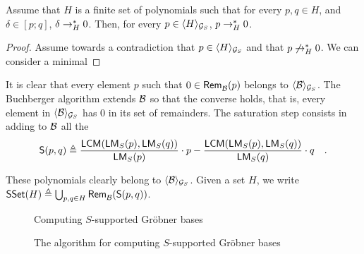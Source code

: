 \begin{lemma}
  \label{lem:weak-complete-impl-strong}
  Assume that $H$ is a finite set of polynomials
  such that for every $p, q \in H$, and $\delta \in [p;q]$,
  $\delta \to^*_{H} 0$.
  Then, for every $p \in \langle H\rangle_{\mathcal{G}_S}$,
  $p \to^*_{H} 0$.
\end{lemma}
\begin{proof}
  Assume towards a contradiction that $p \in \langle H\rangle_{\mathcal{G}_S}$
  and that $p \not\to^*_{H} 0$.
  We can consider a minimal
\end{proof}

\AP It is clear that every element $p$ such that $0 \in \rem{\Basis}{p}$
belongs to $\gen{\Basis}{\group_S}$. The Buchberger algorithm extends $\Basis$
so that the converse holds, that is, every element in $\gen{\Basis}{\group_S}$
has $0$ in its set of remainders. The saturation step consists in adding to
$\Basis$ all the  
\begin{equation}
    \label{eq:d-polynomial}
    \spoly{p}{q} \defined
    \frac{\lcm(\lm[S](p), \lm[S](q))}{\lm[S](p)} \cdot p
    - \frac{\lcm(\lm[S](p), \lm[S](q))}{\lm[S](q)} \cdot q
    \quad .
\end{equation}


These polynomials clearly belong to $\gen{\Basis}{\group_S}$.
Given a set $H$, we write $\spolyset(H) \defined \bigcup_{p,q \in H}
\rem{\Basis}{\spoly{p}{q}}$.

\begin{figure}
    \centering
    \begin{algorithm}[H]
        \caption{Computing $S$-supported Gröbner bases}
        \label{alg:weakgb}
    \end{algorithm}
    \caption{The algorithm for computing $S$-supported Gröbner bases}
    \label{fig:weakgb}
\end{figure}


